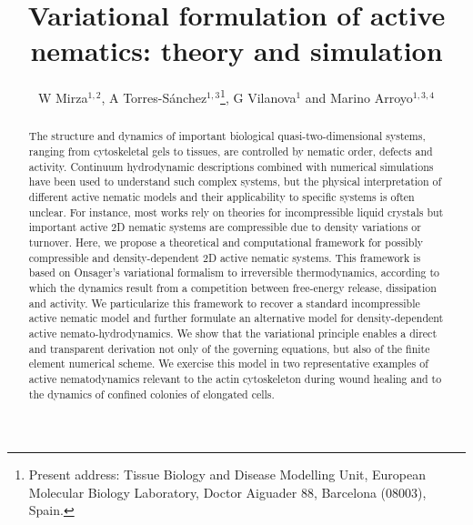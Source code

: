 \documentclass[12pt]{iopart}
\begin{document}
	
	\title[Variational formulation of active nematics: theory and simulation]{Variational formulation of active nematics: theory and simulation}
	
	\author{W Mirza$^{1,2}$, A Torres-S\'anchez$^{1,3}$\footnote{Present address:
			Tissue Biology and Disease Modelling Unit, European Molecular Biology Laboratory, Doctor Aiguader 88, Barcelona (08003), Spain.}, 
		G Vilanova$^1$ and Marino Arroyo$^{1,3,4}$}
	
	\address{$^1$ LaC\`aN, Universitat Polit\`ecnica de Catalunya BarcelonaTech, Jordi Girona 1-3 08034 Barcelona, Spain}
	\address{$^2$ Barcelona Graduate School of Mathematics (BGSMath), Campus de Bellaterra, Edifici C
		08193 Bellaterra Barcelona, Spain}
	\address{$^3$ Institute for Bioengineering of Catalonia (IBEC),
		The Barcelona Institute of Science and Technology (BIST), Baldiri Reixac 10-12, 08028 Barcelona Spain}
	\address{$^4$ Centre Internacional de M\`etodes Num\`erics en Enginyeria (CIMNE), 08034 Barcelona, Spain}
	
	\begin{abstract}
		The structure and dynamics of important biological quasi-two-dimensional systems, ranging from cytoskeletal gels to tissues, are controlled by nematic order, defects and activity. Continuum hydrodynamic descriptions combined with numerical simulations have been used to understand such complex systems, but the physical interpretation of different active nematic models and their applicability to specific systems is often unclear. For instance, most works rely on theories for incompressible liquid crystals but important active 2D nematic systems are compressible due to density variations or turnover. Here, we propose a theoretical and computational framework for possibly compressible and density-dependent 2D active nematic systems. This framework is based on Onsager's variational formalism to irreversible thermodynamics, according to which the dynamics result from a competition between free-energy release, dissipation and activity. We particularize this framework to recover a standard incompressible active nematic model and further formulate an alternative model for density-dependent active nemato-hydrodynamics. We show that the variational principle enables a direct and transparent derivation not only of the governing equations, but also of the finite element numerical scheme. We exercise this model in two representative examples of active nematodynamics relevant to the actin cytoskeleton during wound healing and to the dynamics of confined colonies of elongated cells. 
	\end{abstract}
	
\end{document}
